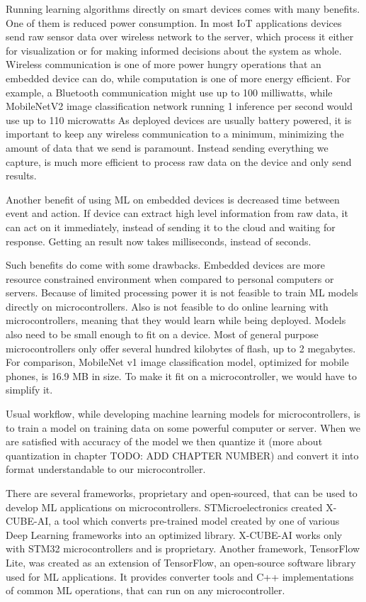 Running learning algorithms directly on smart devices comes with many benefits.
One of them is reduced power consumption.
In most IoT applications devices send raw sensor data over wireless network to the server, which process it either for visualization or for making informed decisions about the system as whole. 
Wireless communication is one of more power hungry operations that an embedded device can do, while computation is one of more energy efficient\cite{pete_tiny}.
For example, a Bluetooth communication might use up to 100 milliwatts, while MobileNetV2 image classification network running 1 inference per second would use up to 110 microwatts\cite{pete_tiny}
As deployed devices are usually battery powered, it is important to keep any wireless communication to a minimum, minimizing the amount of data that we send is paramount.
Instead sending everything we capture, is much more efficient to process raw data on the device and only send results.

Another benefit of using ML on embedded devices is decreased time between event and action.
If device can extract high level information from raw data, it can act on it immediately, instead of sending it to the cloud and waiting for response. 
Getting an result now takes milliseconds, instead of seconds.

Such benefits do come with some drawbacks.
Embedded devices are more resource constrained environment when compared to personal computers or servers.
Because of limited processing power it is not feasible to train ML models directly on microcontrollers.
Also is not feasible to do online learning with microcontrollers, meaning that they would learn while being deployed.
Models also need to be small enough to fit on a device. 
Most of general purpose microcontrollers only offer several hundred kilobytes of flash, up to 2 megabytes.
For comparison, MobileNet v1 image classification model, optimized for mobile phones, is 16.9 MB in size\cite{daniel_edgeimpulse}.
To make it fit on a microcontroller, we would have to simplify it.

Usual workflow, while developing machine learning models for microcontrollers, is to train a model on training data on some powerful computer or server. 
When we are satisfied with accuracy of the model we then quantize it (more about quantization in chapter TODO: ADD CHAPTER NUMBER) and convert it into format understandable to our microcontroller.

There are several frameworks, proprietary and open-sourced, that can be used to develop ML applications on microcontrollers.
STMicroelectronics created X-CUBE-AI, a tool which converts pre-trained model created by one of various Deep Learning frameworks into an optimized library. 
X-CUBE-AI works only with STM32 microcontrollers and is proprietary.
Another framework, TensorFlow Lite, was created as an extension of TensorFlow, an open-source software library used for ML applications.
It provides converter tools and C++ implementations of common ML operations, that can run on any microcontroller.

